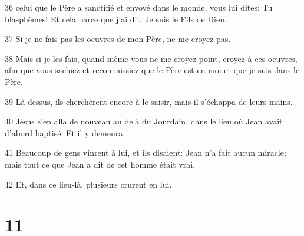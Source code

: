 \par 36 celui que le Père a sanctifié et envoyé dans le monde, vous lui dites: Tu blasphèmes! Et cela parce que j'ai dit: Je suis le Fils de Dieu.
\par 37 Si je ne fais pas les oeuvres de mon Père, ne me croyez pas.
\par 38 Mais si je les fais, quand même vous ne me croyez point, croyez à ces oeuvres, afin que vous sachiez et reconnaissiez que le Père est en moi et que je suis dans le Père.
\par 39 Là-dessus, ils cherchèrent encore à le saisir, mais il s'échappa de leurs mains.
\par 40 Jésus s'en alla de nouveau au delà du Jourdain, dans le lieu où Jean avait d'abord baptisé. Et il y demeura.
\par 41 Beaucoup de gens vinrent à lui, et ils disaient: Jean n'a fait aucun miracle; mais tout ce que Jean a dit de cet homme était vrai.
\par 42 Et, dans ce lieu-là, plusieurs crurent en lui.

\chapter{11}

